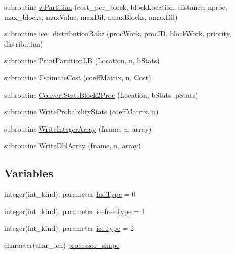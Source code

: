 \begin{DoxyCompactItemize}
\item 
subroutine \hyperlink{namespaceice__distribution_a209b009c99baf5ef254c40774baeaccc}{wPartition} (cost\_\-per\_\-block, blockLocation, distance, nproc, max\_\-blocks, maxValue, maxDil, amaxBlocks, amaxDil)
\item 
subroutine \hyperlink{namespaceice__distribution_aa6d69913a71458cdcb71836b2c12c941}{ice\_\-distributionRake} (procWork, procID, blockWork, priority, distribution)
\item 
subroutine \hyperlink{namespaceice__distribution_abcbe271722878acfc0ee93ce9d8a1342}{PrintPartitionLB} (Location, n, bStats)
\item 
subroutine \hyperlink{namespaceice__distribution_ad81ef2e05e7990db5bd6ed4d80cc6761}{EstimateCost} (coeffMatrix, n, Cost)
\item 
subroutine \hyperlink{namespaceice__distribution_a672be5ed19afd4bc4b99de14c174471e}{ConvertStatsBlock2Proc} (Location, bStats, pStats)
\item 
subroutine \hyperlink{namespaceice__distribution_afb1f8a57908d1a795f7976247cfd935c}{WriteProbabilityStats} (coeffMatrix, n)
\item 
subroutine \hyperlink{namespaceice__distribution_a671ab022211c1686b8fd0adf14d752b5}{WriteIntegerArray} (fname, n, array)
\item 
subroutine \hyperlink{namespaceice__distribution_a273a42a83659ff86cfa8099c186ec503}{WriteDblArray} (fname, n, array)
\end{DoxyCompactItemize}
\subsection*{Variables}
\begin{DoxyCompactItemize}
\item 
integer(int\_\-kind), parameter \hyperlink{namespaceice__distribution_a70c7db6c7a84f62b66e1a5880040b9aa}{lndType} = 0
\item 
integer(int\_\-kind), parameter \hyperlink{namespaceice__distribution_a9a24a6c9c4809cf7bcc2f823d5658e91}{icefreeType} = 1
\item 
integer(int\_\-kind), parameter \hyperlink{namespaceice__distribution_ad7d8ab8d3b272938146dae0343de0ffb}{iceType} = 2
\item 
character(char\_\-len) \hyperlink{namespaceice__distribution_a3f7e1befe15a2793e62360b81c5fa130}{processor\_\-shape}
\end{DoxyCompactItemize}


